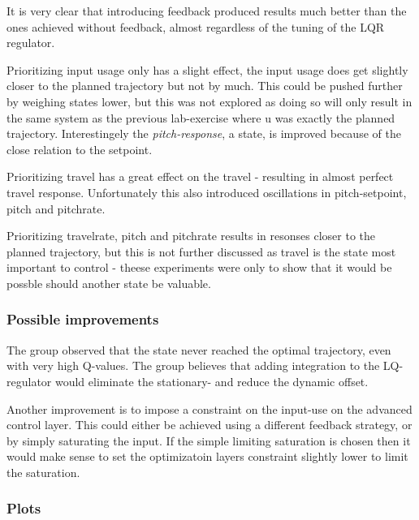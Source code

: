 \documentclass[../main.tex]{subfiles}
\begin{document}
It is very clear that introducing feedback produced results much better than the ones achieved without feedback, almost regardless of the tuning of the LQR regulator.

Prioritizing input usage only has a slight effect, the input usage does get slightly closer to the planned trajectory but not by much. This could be pushed further by weighing states lower, but this was not explored as doing so will only result in the same system as the previous lab-exercise where u was exactly the planned trajectory. Interestingely the \textit{pitch-response}, a state, is improved because of the close relation to the setpoint.

Prioritizing travel has a great effect on the travel - resulting in almost perfect travel response. Unfortunately this also introduced oscillations in pitch-setpoint, pitch and pitchrate.

Prioritizing travelrate, pitch and pitchrate results in resonses closer to the planned trajectory, but this is not further discussed as travel is the state most important to control - theese experiments were only to show that it would be possble should another state be valuable.

\subsubsection{Possible improvements}
The group observed that the state never reached the optimal trajectory, even with very high Q-values. The group believes that adding integration to the LQ-regulator would eliminate the stationary- and reduce the dynamic offset.

Another improvement is to impose a constraint on the input-use on the advanced control layer. This could either be achieved using a different feedback strategy, or by simply saturating the input. If the simple limiting saturation is chosen then it would make sense to set the optimizatoin layers constraint slightly lower to limit the saturation.

\subsubsection{Plots}
\end{document}
